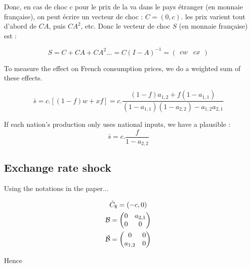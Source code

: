 \documentclass[11pt,a4paper]{article}
\begin{document}
Donc, en cas de choc $c$ pour le prix de la va dans le pays étranger (en monnaie française), on peut écrire un vecteur de choc : $C=\left(0,c\right)$.  les prix varient tout d'abord de  $CA$, puis $CA^2$, etc. Donc le vecteur de choc $S$ (en monnaie française) est : 


\begin{equation*}
S=C+CA+CA^2...=C(I-A)^{-1}=\left(\begin{matrix}cw  &   cx\end{matrix}\right)
\end{equation*}

To measure the effect on French consumption prices, we do a weighted sum of these effects.

\begin{equation}
\bar{s}=c.\left[\left(1-f\right)w+xf\right]=c.\frac{\left(1-f\right)a_{1,2}+f\left(1-a_{1,1}\right)}{\left(1-a_{1,1}\right)\left(1-a_{2,2}\right)-a_{1,2}a_{2,1}}
\end{equation}

If each nation's production only uses national inputs, we have a plausible :
\begin{equation*}
\bar{s}=c.\frac{f}{1-a_{2,2}}
\end{equation*}

\subsection{Exchange rate shock}

Using the notations in the paper...

\begin{gather*}
\hat{C}_\$=\left(-c,0\right)
\\
\cal B = \left(\begin{matrix}0&a_{2,1}\\0&0\end{matrix}\right)
\\
\tilde{\cal B} = \left(\begin{matrix}0&0\\a_{1,2}&0\end{matrix}\right)
\end{gather*}

Hence
\end{document}

